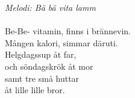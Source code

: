 {\footnotesize\textit{Melodi: Bä bä vita lamm}}\\
\\
Be-Be- vitamin, finns i brännevin.\\
Mången kalori, simmar däruti.\\
Helgdagssup åt far,\\
och söndagskrök åt mor\\
samt tre små huttar\\
åt lille lille bror.\\